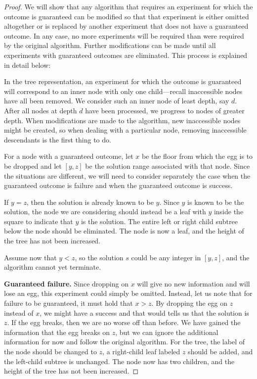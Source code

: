 \documentclass[10pt,a4paper]{amsart}
\begin{document}
\begin{proof}
We will show that any algorithm that requires 
an experiment for which the outcome is guaranteed can be modified
so that that experiment is either omitted altogether or is
replaced by another experiment that does not have a 
guaranteed outcome. In any case, no more  experiments will be required
than were required by the original algorithm. Further modifications can be made 
until all experiments with guaranteed outcomes are eliminated.
This process is explained in detail below:

In the tree representation,
an experiment for which the outcome is guaranteed
will correspond to an inner node with only one child---recall
inaccessible nodes have all been removed. We consider such an inner 
node of least depth, say  $d$. After all nodes at depth $d$ have
been processed, we progress to nodes of greater depth.
When modifications are made to the algorithm, new inaccessible nodes
might be created, so when dealing with a particular node, removing
inaccessible descendants  is the first thing to do.

\medskip
For a node with a guaranteed outcome, let $x$ be the floor from which the
egg is to be dropped
and let $[y,z]$ be the solution range associated with that node. 
Since the situations are different, we will need to
consider separately the case when the guaranteed outcome is failure
and when the guaranteed outcome is success.

If $y=z$, then the solution is already known to be $y$. Since $y$ is known 
to be the solution, the node we are considering should instead be a leaf with $y$ inside 
the square to indicate that $y$ is the solution.
The entire left or  right child subtree below 
the node should be eliminated. The node is now a leaf, and the height of the
tree has not been increased.

Assume now that $y<z$, so  the solution $s$ could be any integer in $[y,z]$, 
and the algorithm cannot yet terminate.

\medskip
\noindent
\textbf{Guaranteed failure.}  Since dropping on $x$ will give no new information
and will lose an egg, this experiment could simply be omitted. Instead,
let us note that for failure to be guaranteed, it must hold that $x>z$.
By dropping the egg on $z$ instead of $x$, we might have a success and that
would tells us that the solution is $z$. If the egg breaks, then we are no
worse off than before. We have gained the information that the egg breaks on $z$,
but we can ignore the additional information for now and follow the
original algorithm.
For the tree, the label of the  node should be changed to $z$,
a right-child leaf labeled $z$ should be added, and the left-child 
subtree is unchanged. The node now has two children, and 
the height of the tree has not been increased. 


\end{proof}
\end{document}
